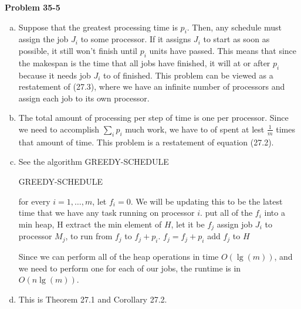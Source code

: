 \documentclass{article}
\begin{document}
\noindent\textbf{Problem 35-5}\\
\begin{enumerate}[a.]
\item
Suppose that the greatest processing time is $p_i$. Then, any schedule must assign the job $J_i$ to some processor. If it assigns $J_i$ to start as soon as possible, it still won't finish until $p_i$ units have passed. This means that since the makespan is the time that all jobs have finished, it will at or after $p_i$ because it needs job $J_i$ to of finished. This problem can be viewed as a restatement of (27.3), where we have an infinite number of processors and assign each job to its own processor.
\item
The total amount of processing per step of time is one per processor. Since we need to accomplish $\sum_{i} p_i$ much work, we have to of spent at lest $\frac{1}{m}$ times that amount of time. This problem is a restatement of equation (27.2).
\item
See the algorithm GREEDY-SCHEDULE

\begin{algorithm}
\caption{GREEDY-SCHEDULE}
\begin{algorithmic}
\State for every $i=1,\ldots,m$, let $f_i =0$. We will be updating this to be the latest time that we have any task running on processor $i$.
\State put all of the $f_i$ into a min heap, H
\State extract the min element of $H$, let it be $f_j$
\State assign job $J_i$ to processor $M_j$, to run from $f_j$ to $f_j + p_i$.
\State $f_j = f_j +p_i$
\State add $f_j$ to $H$
\EndWhile
\end{algorithmic}
\end{algorithm}

Since we can perform all of the heap operations in time $O(\lg(m))$, and we need to perform one for each of our jobs, the runtime is in $O(n\lg(m))$.

\item
This is Theorem 27.1 and Corollary 27.2.
\end{enumerate}
\end{document}
